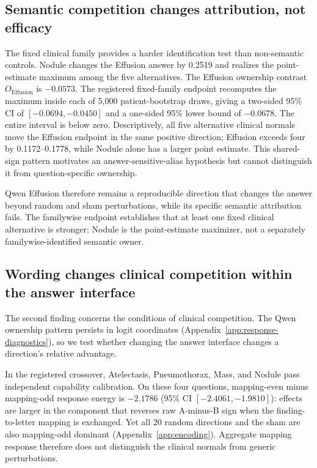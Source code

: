 \subsection{Semantic competition changes attribution, not efficacy}
\label{sec:specificity-results}

The fixed clinical family provides a harder identification test than non-semantic controls. Nodule changes the Effusion answer by 0.2519 and realizes the point-estimate maximum among the five alternatives. The Effusion ownership contrast $O_{\mathrm{Effusion}}$ is $-0.0573$. The registered fixed-family endpoint recomputes the maximum inside each of 5,000 patient-bootstrap draws, giving a two-sided 95\% CI of $[-0.0694,-0.0450]$ and a one-sided 95\% lower bound of $-0.0678$. The entire interval is below zero. Descriptively, all five alternative clinical normals move the Effusion endpoint in the same positive direction; Effusion exceeds four by 0.1172--0.1778, while Nodule alone has a larger point estimate. This shared-sign pattern motivates an answer-sensitive-alias hypothesis but cannot distinguish it from question-specific ownership.

Qwen Effusion therefore remains a reproducible direction that changes the answer beyond random and sham perturbations, while its specific semantic attribution fails. The familywise endpoint establishes that at least one fixed clinical alternative is stronger; Nodule is the point-estimate maximizer, not a separately familywise-identified semantic owner.

\subsection{Wording changes clinical competition within the answer interface}
\label{sec:encoding-results}

The second finding concerns the conditions of clinical competition. The Qwen ownership pattern persists in logit coordinates (Appendix~\ref{app:response-diagnostics}), so we test whether changing the answer interface changes a direction's relative advantage.

In the registered crossover, Atelectasis, Pneumothorax, Mass, and Nodule pass independent capability calibration. On these four questions, mapping-even minus mapping-odd response energy is $-2.1786$ (95\% CI $[-2.4061,-1.9810]$): effects are larger in the component that reverses raw A-minus-B sign when the finding-to-letter mapping is exchanged. Yet all 20 random directions and the sham are also mapping-odd dominant (Appendix~\ref{app:encoding}). Aggregate mapping response therefore does not distinguish the clinical normals from generic perturbations.

